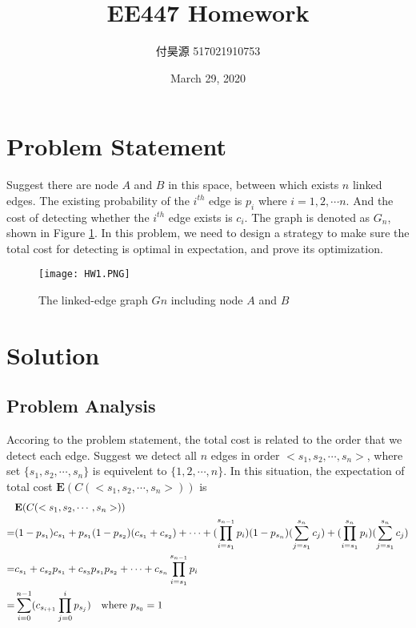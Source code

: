 \documentclass[twoside]{article}
\title{\textbf{EE447 Homework}}
\author{付昊源 517021910753}
\date{March 29, 2020}
\begin{document}
\maketitle

\section*{Problem Statement}
Suggest there are node $A$ and $B$ in this space, between which exists $n$ linked edges. The existing probability of the $i^{th}$ edge is $p_i$ where $i=1,2,\cdots n$. And the cost of detecting whether the $i^{th}$ edge exists is $c_i$. The graph is denoted as $G_n$, shown in Figure \ref{HW1_fig}. In this problem, we need to design a strategy to make sure the total cost for detecting is optimal in expectation, and prove its optimization.
\begin{figure}[h]
    \centering
    \texttt{[image: HW1.PNG]}
    \caption{The linked-edge graph $Gn$ including node $A$ and $B$}
    \label{HW1_fig}
\end{figure}

\section*{Solution}
\subsection*{Problem Analysis}
Accoring to the problem statement, the total cost is related to the order that we detect each edge. Suggest we detect all $n$ edges in order $<s_1,s_2,\cdots,s_n>$, where set $\{s_1, s_2,\cdots,s_n\}$ is equivelent to $\{1,2,\cdots,n\}$. In this situation, the expectation of total cost $\textbf{E}(C(<s_1,s_2,\cdots,s_n>))$ is
\begin{equation}\label{equation}
    \begin{aligned}
        &\textbf{E}(C(<s_1,s_2,\cdots,s_n>)) \\
        =& (1-p_{s_1})c_{s_1}+p_{s_1}(1-p_{s_2})(c_{s_1}+c_{s_2})+\cdots+(\prod_{i=s_1}^{s_{n-1}}p_i)(1-p_{s_n})(\sum_{j=s_1}^{s_n}c_j)+(\prod_{i=s_1}^{s_{n}}p_i)(\sum_{j=s_1}^{s_n}c_j) \\
        =& c_{s_1}+c_{s_2}p_{s_1}+c_{s_3}p_{s_1}p_{s_2}+\cdots+c_{s_n}\prod_{i=s_1}^{s_{n-1}}p_i \\ 
        =& \sum_{i=0}^{n-1}(c_{s_{i+1}}\prod_{j=0}^{i}p_{s_j}) \text{\quad where $p_{s_0}=1$}
    \end{aligned}
\end{equation}
\end{document}
